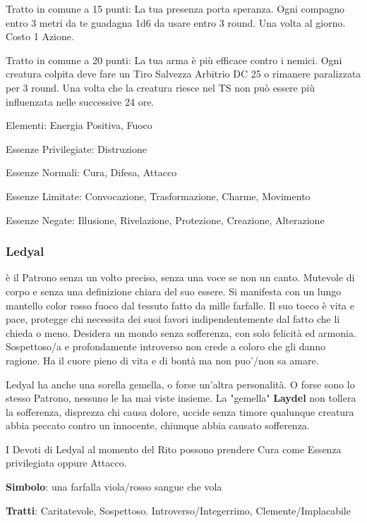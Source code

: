 \documentclass[a4paper,11pt,twoside,openany]{book}
\begin{document}
Tratto in comune a 15 punti: La tua presenza porta speranza. Ogni compagno entro 3 metri da te guadagna 1d6 da usare entro 3 round. Una volta al giorno. Costo 1 Azione.

Tratto in comune a 20 punti: La tua arma è più efficace contro i nemici. Ogni creatura colpita deve fare un Tiro Salvezza Arbitrio DC 25 o rimanere paralizzata per 3 round. Una volta che la creatura riesce nel TS non può essere più influenzata nelle successive 24 ore.

\bigskip

Elementi: Energia Positiva, Fuoco

\bigskip

Essenze Privilegiate: Distruzione

Essenze Normali: Cura, Difesa, Attacco

Essenze Limitate: Convocazione, Trasformazione, Charme, Movimento

Essenze Negate: Illusione, Rivelazione, Protezione, Creazione, Alterazione

\subsubsection{Ledyal}

\label{ledyal}

è il Patrono senza un volto preciso, senza una voce se non un canto. Mutevole di corpo e senza una definizione chiara del suo essere. Si manifesta con un lungo mantello color rosso fuoco dal tessuto fatto da mille farfalle. Il suo tocco è vita e pace, protegge chi necessita dei suoi favori indipendentemente dal fatto che li chieda o meno. Desidera un mondo senza sofferenza, con solo felicità ed armonia. Sospettoso/a e profondamente introverso non crede a coloro che gli danno ragione. Ha il cuore pieno di vita e di bontà ma non puo'/non sa amare.

Ledyal ha anche una sorella gemella, o forse un'altra personalità. O forse sono lo stesso Patrono, nessuno le ha mai viste insieme. La "gemella" \textbf{Laydel} non tollera la sofferenza, disprezza chi causa dolore, uccide senza timore qualunque creatura abbia peccato contro un innocente, chiunque abbia causato sofferenza.

I Devoti di Ledyal al momento del Rito possono prendere Cura come Essenza privilegiata oppure Attacco.

\textbf{Simbolo}: una farfalla viola/rosso sangue che vola

\textbf{Tratti}: Caritatevole, Sospettoso. Introverso/Integerrimo, Clemente/Implacabile
\end{document}
